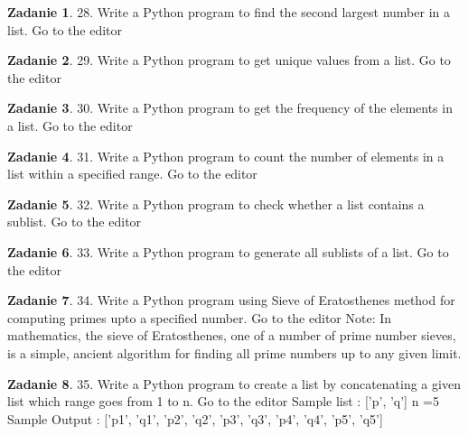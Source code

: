 \documentclass[11pt]{article}
\theoremstyle{definition}
\newtheorem{zadanie}{Zadanie}
\begin{document}
\begin{zadanie}


28. Write a Python program to find the second largest number in a list. Go to the editor


\end{zadanie}

\begin{zadanie}


29. Write a Python program to get unique values from a list. Go to the editor


\end{zadanie}

\begin{zadanie}


30. Write a Python program to get the frequency of the elements in a list. Go to the editor


\end{zadanie}

\begin{zadanie}


31. Write a Python program to count the number of elements in a list within a specified range. Go to the editor


\end{zadanie}

\begin{zadanie}


32. Write a Python program to check whether a list contains a sublist. Go to the editor


\end{zadanie}

\begin{zadanie}


33. Write a Python program to generate all sublists of a list. Go to the editor


\end{zadanie}

\begin{zadanie}


34. Write a Python program using Sieve of Eratosthenes method for computing primes upto a specified number. Go to the editor
Note: In mathematics, the sieve of Eratosthenes, one of a number of prime number sieves, is a simple, ancient algorithm for finding all prime numbers up to any given limit.


\end{zadanie}

\begin{zadanie}


35. Write a Python program to create a list by concatenating a given list which range goes from 1 to n. Go to the editor
Sample list : ['p', 'q']
n =5
Sample Output : ['p1', 'q1', 'p2', 'q2', 'p3', 'q3', 'p4', 'q4', 'p5', 'q5']


\end{zadanie}
\end{document}
